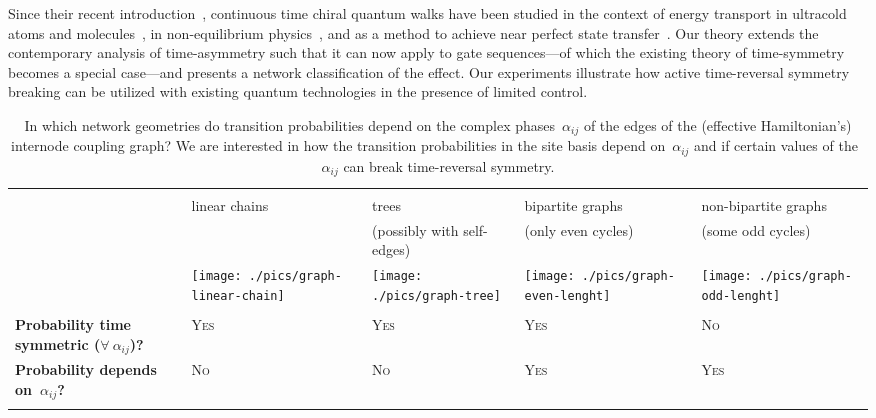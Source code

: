 \documentclass[aps,prx,10pt,
               superscriptaddress,
               twocolumn,
               longbibliography,
showpacs]{revtex4-1}
\theoremstyle{plain}
\theoremstyle{definition}
\begin{document}
Since their recent introduction~\cite{Z13}, continuous time chiral quantum walks
have been studied in the context of energy transport in ultracold atoms and
molecules~\cite{xiang2013transfer}, in non-equilibrium
physics~\cite{bedkihal2013transfer,manzano2013transfer}, and as a method to achieve near
perfect state transfer~\cite{Z13, cameron2013transfer}.  Our theory extends the
contemporary analysis of time-asymmetry such that it can now apply to gate
sequences---of which the existing theory of time-symmetry becomes a special
case---and presents a network classification of the effect. Our experiments
illustrate how active time-reversal symmetry breaking
can be utilized with existing quantum technologies in the presence of limited
control.

\begin{table*}
      \begin{tabular}{C{3.5cm}C{3.5cm}C{3.5cm}C{3.5cm}C{3.5cm}}
        \toprule\\
        & linear chains
        & trees 
        & bipartite graphs
        & non-bipartite graphs\\
        &&(possibly with self-edges)
        &  (only even cycles)
        & (some odd cycles)\\
        &
        \begin{minipage}{3cm}
          \texttt{[image: ./pics/graph-linear-chain]}
        \end{minipage}
        &
        \begin{minipage}{3cm}
          \texttt{[image: ./pics/graph-tree]}
        \end{minipage}
        &
        \begin{minipage}{3cm}
          \texttt{[image: ./pics/graph-even-lenght]}
        \end{minipage}
        &
        \begin{minipage}{3cm}
          \texttt{[image: ./pics/graph-odd-lenght]}
        \end{minipage}\\[0.5cm]
        \midrule\\
        {\bfseries Probability time symmetric ($\forall\ \alpha_{ij}$)?}
        & \textsc{Yes}
        & \textsc{Yes}
        & \textsc{Yes}
        & \textsc{No}\\
        {\bfseries Probability depends on~$\alpha_{ij}$?}
        & \textsc{No}
        & \textsc{No}
        & \textsc{Yes}
        & \textsc{Yes}\\
        \bottomrule\\
      \end{tabular}
\caption{
In which network geometries do transition probabilities depend on
the complex phases~$\alpha_{ij}$ of the edges of the
(effective Hamiltonian's) internode coupling graph?
We are interested in how the transition probabilities in the site basis
depend on~$\alpha_{ij}$ and if certain values of the~$\alpha_{ij}$ can break time-reversal symmetry.
\label{tab:graph-table}
}
\end{table*}
\end{document}
